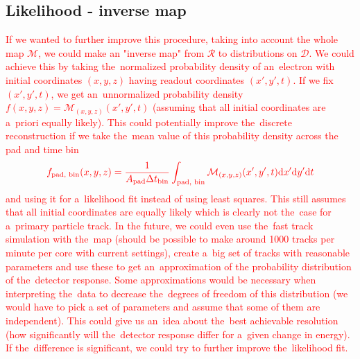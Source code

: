 		\subsection*{Likelihood - inverse map}
			\textcolor{red}{If we wanted to further improve this procedure, taking into account the whole map $\mathcal{M}$, we could make an "inverse map" from $\mathcal{R}$ to distributions on $\mathcal{D}$. We could achieve this by taking the~normalized probability density of an~electron with initial coordinates $(x,y,z)$ having readout coordinates $(x',y',t)$. If we fix $(x',y',t)$, we get an~unnormalized probability density $f(x,y,z) = \mathcal{M}_{(x,y,z)}(x',y',t)$ (assuming that all initial coordinates are a~priori equally likely). This could potentially improve the~discrete reconstruction if we take the~mean value of this probability density across the pad and time bin}
				\begin{equation}
					\color{red}
					f_\text{pad, bin}(x,y,z) = \frac{1}{A_\text{pad} \Delta t_\text{bin}} \int_\text{pad, bin} \mathcal{M}_{(x,y,z)}(x',y',t) 	\text{d}x'\text{d}y'\text{d}t
				\end{equation}
			\textcolor{red}{and using it for a~likelihood fit instead of using least squares. This still assumes that all initial coordinates are equally likely which is clearly not the~case for a~primary particle track. In the future, we could even use the~fast track simulation with the~map (should be possible to make around 1000 tracks per minute per core with current settings), create a~big set of tracks with reasonable parameters and use these to get an~approximation of the probability distribution of the~detector response. Some approximations would be necessary when interpreting the~data to decrease the~degrees of freedom of this distribution (we would have to pick a set of parameters and assume that some of them are independent). This could give us an~idea about the~best achievable resolution (how significantly will the~detector response differ for a~given change in energy). If the~difference is significant, we could try to further improve the~likelihood fit.}